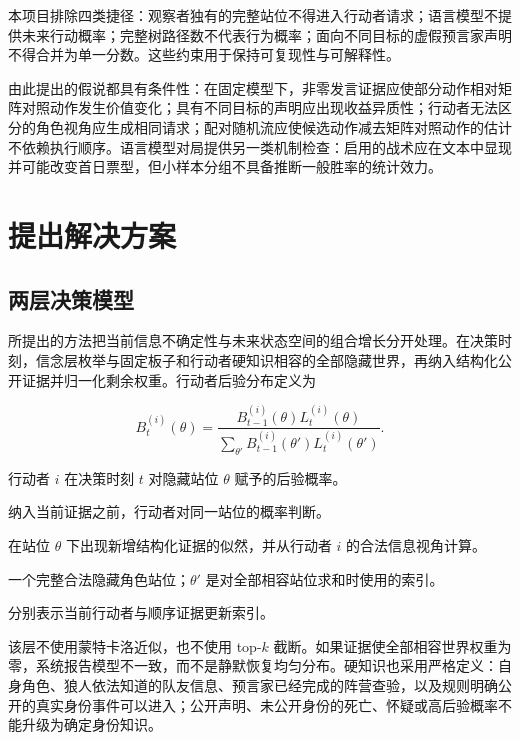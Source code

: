 \documentclass[UTF8,11pt,a4paper,fontset=windows]{ctexart}
\begin{document}
本项目排除四类捷径：观察者独有的完整站位不得进入行动者请求；语言模型不提供未来行动概率；完整树路径数不代表行为概率；面向不同目标的虚假预言家声明不得合并为单一分数。这些约束用于保持可复现性与可解释性。

由此提出的假说都具有条件性：在固定模型下，非零发言证据应使部分动作相对矩阵对照动作发生价值变化；具有不同目标的声明应出现收益异质性；行动者无法区分的角色视角应生成相同请求；配对随机流应使候选动作减去矩阵对照动作的估计不依赖执行顺序。语言模型对局提供另一类机制检查：启用的战术应在文本中显现并可能改变首日票型，但小样本分组不具备推断一般胜率的统计效力。

\section{提出解决方案}

\subsection{两层决策模型}

所提出的方法把当前信息不确定性与未来状态空间的组合增长分开处理。在决策时刻，信念层枚举与固定板子和行动者硬知识相容的全部隐藏世界，再纳入结构化公开证据并归一化剩余权重。行动者后验分布定义为

\[
B_t^{(i)}(\theta)=
\frac{B_{t-1}^{(i)}(\theta)L_t^{(i)}(\theta)}
{\sum_{\theta'}B_{t-1}^{(i)}(\theta')L_t^{(i)}(\theta')}.
\]

\begin{description}[style=nextline,leftmargin=3.4cm,labelwidth=3.0cm]
  \item[$B_t^{(i)}(\theta)$] 行动者 $i$ 在决策时刻 $t$ 对隐藏站位 $\theta$ 赋予的后验概率。
  \item[$B_{t-1}^{(i)}(\theta)$] 纳入当前证据之前，行动者对同一站位的概率判断。
  \item[$L_t^{(i)}(\theta)$] 在站位 $\theta$ 下出现新增结构化证据的似然，并从行动者 $i$ 的合法信息视角计算。
  \item[$\theta$] 一个完整合法隐藏角色站位；$\theta'$ 是对全部相容站位求和时使用的索引。
  \item[$i,t$] 分别表示当前行动者与顺序证据更新索引。
\end{description}

该层不使用蒙特卡洛近似，也不使用 top-$k$ 截断。如果证据使全部相容世界权重为零，系统报告模型不一致，而不是静默恢复均匀分布。硬知识也采用严格定义：自身角色、狼人依法知道的队友信息、预言家已经完成的阵营查验，以及规则明确公开的真实身份事件可以进入；公开声明、未公开身份的死亡、怀疑或高后验概率不能升级为确定身份知识。
\end{document}
